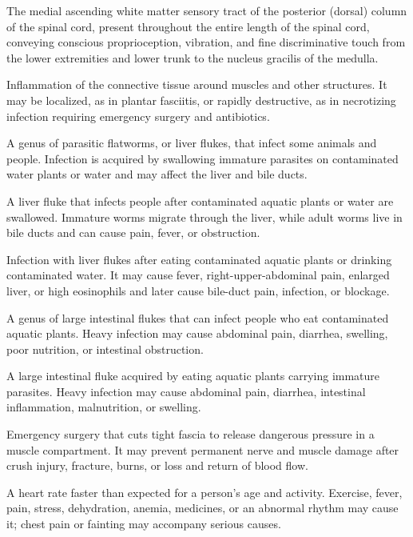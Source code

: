  The medial ascending white matter sensory tract of the posterior (dorsal) column of the spinal cord, present throughout the entire length of the spinal cord, conveying conscious proprioception, vibration, and fine discriminative touch from the lower extremities and lower trunk to the nucleus gracilis of the medulla.

 Inflammation of the connective tissue around muscles and other structures. It may be localized, as in plantar fasciitis, or rapidly destructive, as in necrotizing infection requiring emergency surgery and antibiotics.

 A genus of parasitic flatworms, or liver flukes, that infect some animals and people. Infection is acquired by swallowing immature parasites on contaminated water plants or water and may affect the liver and bile ducts.

 A liver fluke that infects people after contaminated aquatic plants or water are swallowed. Immature worms migrate through the liver, while adult worms live in bile ducts and can cause pain, fever, or obstruction.

 Infection with liver flukes after eating contaminated aquatic plants or drinking contaminated water. It may cause fever, right-upper-abdominal pain, enlarged liver, or high eosinophils and later cause bile-duct pain, infection, or blockage.

 A genus of large intestinal flukes that can infect people who eat contaminated aquatic plants. Heavy infection may cause abdominal pain, diarrhea, swelling, poor nutrition, or intestinal obstruction.

 A large intestinal fluke acquired by eating aquatic plants carrying immature parasites. Heavy infection may cause abdominal pain, diarrhea, intestinal inflammation, malnutrition, or swelling.

 Emergency surgery that cuts tight fascia to release dangerous pressure in a muscle compartment. It may prevent permanent nerve and muscle damage after crush injury, fracture, burns, or loss and return of blood flow.

 A heart rate faster than expected for a person’s age and activity. Exercise, fever, pain, stress, dehydration, anemia, medicines, or an abnormal rhythm may cause it; chest pain or fainting may accompany serious causes.

